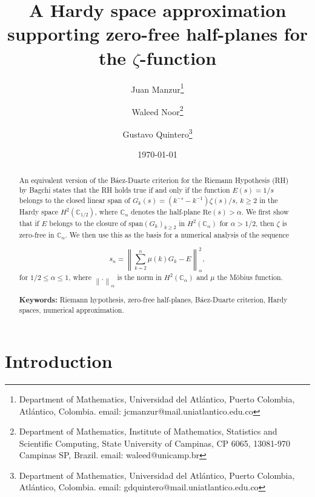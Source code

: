 \documentclass[11pt]{extarticle}
\numberwithin{equation}{section}
\newcommand{\C}{\mathbb{C}}
\theoremstyle{plain}
\theoremstyle{definition}
\begin{document}
\title{A Hardy space approximation supporting zero-free half-planes for the $\zeta$-function}

\author{
    Juan Manzur\thanks{Department of Mathematics,
    Universidad del Atlántico, Puerto Colombia, Atlántico, Colombia. email: jcmanzur@mail.uniatlantico.edu.co}
    \and
    Waleed Noor\thanks{Department of Mathematics,
    Institute of Mathematics, Statistics and Scientific Computing,
    State University of Campinas, CP 6065, 13081-970 Campinas
    SP, Brazil. email: waleed@unicamp.br}
    \and
    Gustavo Quintero\thanks{Department of Mathematics, Universidad del Atlántico, Puerto Colombia, Atlántico, Colombia. email: gdquintero@mail.uniatlantico.edu.co}
}

\date\today
\maketitle

\begin{abstract}
An equivalent version of the Báez-Duarte criterion \cite{baez} for the Riemann Hypothesis (RH) by Bagchi \cite{bagchi}  states that the RH holds true if and only if the function  $E(s) = 1/s$ belongs to the closed linear span of $G_k(s) = (k^{-s} - k^{-1})\zeta(s)/s,\, k \geq 2$ in the Hardy space \( H^2(\C_{1/2}) \), where $\C_{\alpha}$ denotes the half-plane $\mathrm{Re}(s)>\alpha$. We first show that if $E$ belongs to the closure of span$(G_k)_{k\geq 2}$ in \( H^2(\C_{\alpha}) \) for $\alpha>1/2$, then $\zeta$ is zero-free in $\mathbb{C}_\alpha$. We then use this as the basis for a numerical analysis of the sequence

\[
s_n = \left\| \sum_{k=2}^{n} \mu(k) G_k - E \right\|^2_\alpha,
\]
for $1/2\leq \alpha \leq 1$, where $\left\|.\right\|_\alpha$ is the norm in $H^2(\C_{\alpha})$ and $\mu$ the Möbius function.
 
\bigskip
\noindent
\textbf{Keywords:} Riemann hypothesis, zero-free half-planes, B\'aez-Duarte criterion, Hardy spaces, numerical approximation.

\end{abstract}

\section{Introduction}
\end{document}
